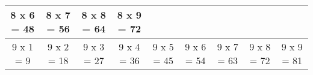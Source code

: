 \documentclass[a4paper,landscape,11pt]{article}
\begin{document}
\begin{tabular}{|c|c|c|c|c|c|c|c|c|}
  
  8 x 6 = 48
  
  &
  
  
  8 x 7 = 56
  
  &
  
  
  8 x 8 = 64
  
  &
  
  
  8 x 9 = 72
  
  
  \\ \hline
  
  
  9 x 1 = 9
  
  &
  
  
  9 x 2 = 18
  
  &
  
  
  9 x 3 = 27
  
  &
  
  
  9 x 4 = 36
  
  &
  
  
  9 x 5 = 45
  
  &
  
  
  9 x 6 = 54
  
  &
  
  
  9 x 7 = 63
  
  &
  
  
  9 x 8 = 72
  
  &
  
  
  9 x 9 = 81
  
  
  \\ \hline
  
\end{tabular}
\end{document}
